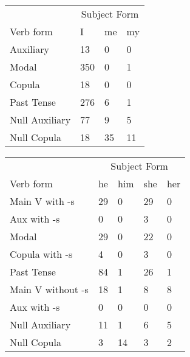 \begin{table}[]
    \begin{minipage}{0.5\textwidth}
    \centering
    \begin{tabular}{@{}llll@{}}
        \toprule
            &\multicolumn{3}{c}{Subject Form}\\
            \cline{2-4}
        Verb form & I & me & my \\
        \midrule
        Auxiliary & 13 & 0 & 0 \\
        Modal & 350 & 0 & 1 \\
        Copula & 18 & 0 & 0 \\
        Past Tense & 276 & 6 & 1 \\
        \hline
        Null Auxiliary & 77 & 9 & 5 \\
        Null Copula & 18 & 35 & 11 \\
        \bottomrule
    \end{tabular}
\end{minipage}
\begin{minipage}{0.5\textwidth}
    \centering
    \begin{tabular}{@{}lllll@{}}
        \toprule
            &\multicolumn{4}{c}{Subject Form}\\
            \cline{2-5}
        Verb form & he & him & she & her \\
        \midrule
        Main V with -s & 29 & 0 & 29 & 0 \\
        Aux with -s & 0 & 0 & 3 & 0 \\
        Modal & 29 & 0 & 22 & 0 \\
        Copula with -s & 4 & 0 & 3 & 0 \\
        Past Tense & 84 & 1 & 26 & 1 \\
        \hline
        Main V without -s & 18 & 1 & 8 & 8 \\
        Aux with -s & 0 & 0 & 0 & 0 \\
        Null Auxiliary & 11 & 1 & 6 & 5 \\
        Null Copula & 3 & 14 & 3 & 2 \\
        \bottomrule
    \end{tabular}
\end{minipage}
\end{table}
